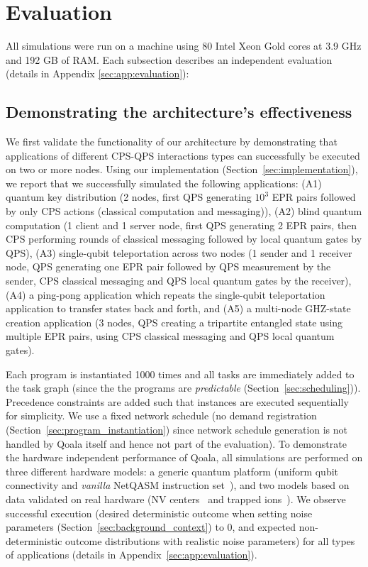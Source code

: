 \section{Evaluation}
\label{qoala:sec:evaluation}
All simulations were run on a machine using 80 Intel Xeon Gold cores at 3.9 GHz and 192 GB of RAM.
Each subsection describes an independent evaluation (details in Appendix \ref{sec:app:evaluation}):

\subsection{Demonstrating the architecture's effectiveness}
\label{sec:demonstrating_architecture_effectiveness}
We first validate the functionality of our architecture by demonstrating that applications of different CPS-QPS interactions types can successfully be executed on two or more nodes.
Using our implementation (Section~\ref{sec:implementation}), we report that we successfully simulated the following applications:
(A1) quantum key distribution (2 nodes, first QPS generating $10^3$ EPR pairs followed by only CPS actions (classical computation and messaging)),
(A2) blind quantum computation (1 client and 1 server node, first QPS generating 2 EPR pairs, then CPS performing rounds of classical messaging followed by local quantum gates by QPS),
(A3) single-qubit teleportation across two nodes (1 sender and 1 receiver node, QPS generating one EPR pair followed by QPS measurement by the sender, CPS classical messaging and QPS local quantum gates by the receiver),
(A4) a ping-pong application which repeats the single-qubit teleportation application to transfer states back and forth,
and (A5) a multi-node GHZ-state~\cite{greenberger1989going} creation application (3 nodes, QPS creating a tripartite entangled state using multiple EPR pairs, using CPS classical messaging and QPS local quantum gates).

Each program is instantiated 1000 times and all tasks are immediately added to the task graph (since the the programs are \textit{predictable} (Section~\ref{sec:scheduling})).
Precedence constraints are added such that instances are executed sequentially for simplicity.
We use a fixed network schedule (no demand registration (Section~\ref{sec:program_instantiation}) since network schedule generation is not handled by Qoala itself and hence not part of the evaluation).
To demonstrate the hardware independent performance of Qoala, all simulations are performed on three different hardware models: a generic quantum platform (uniform qubit connectivity and \textit{vanilla} NetQASM instruction set~\cite{dahlberg2022netqasm}),
and two models based on data validated on real hardware (NV centers~\cite{bradley2019ten, hermans2022qubit} and trapped ions~\cite{krutyanskiy2023entanglement}). 
We observe successful execution (desired deterministic outcome when setting noise parameters (Section~\ref{sec:background_context}) to 0, and expected non-deterministic outcome distributions with realistic noise parameters) for all types of applications (details in Appendix~\ref{sec:app:evaluation}).

